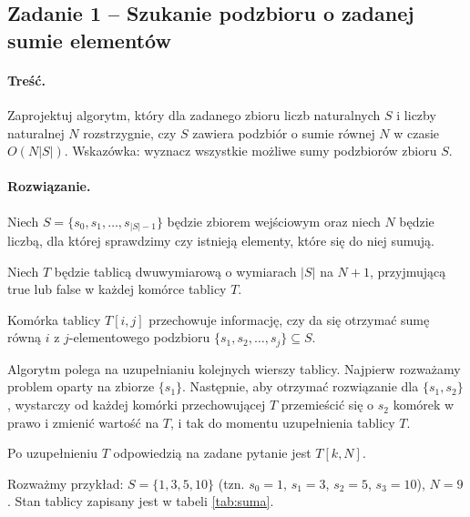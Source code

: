 \subsection{Zadanie 1 -- Szukanie podzbioru o zadanej sumie elementów}

\paragraph{Treść.} Zaprojektuj algorytm, który dla zadanego zbioru 
liczb naturalnych $S$ i liczby naturalnej $N$ rozstrzygnie,
czy $S$ zawiera podzbiór o sumie równej $N$ w czasie $O(N |S|)$.
Wskazówka: wyznacz wszystkie możliwe sumy podzbiorów zbioru $S$.

\paragraph{Rozwiązanie.} Niech $S = \{s_0, s_1, \dots, s_{|S| - 1}\}$ będzie zbiorem wejściowym oraz 
niech $N$ będzie liczbą, dla której sprawdzimy czy istnieją elementy, które się do niej sumują.

Niech $T$ będzie tablicą dwuwymiarową o wymiarach $|S|$ na $N + 1$, przyjmującą
\textsf{true} lub \textsf{false} w każdej komórce tablicy $T$.

Komórka tablicy $T[i, j]$ przechowuje informację, czy da się otrzymać 
sumę równą $i$ z $j$-elementowego podzbioru $\{s_1, s_2, \dots, s_j\} \subseteq S$.

Algorytm polega na uzupełnianiu kolejnych wierszy tablicy.
Najpierw rozważamy problem oparty na zbiorze $\{s_1\}$. 
Następnie, aby otrzymać rozwiązanie dla $\{s_1, s_2\}$, wystarczy
od każdej komórki przechowującej $T$ przemieścić się o $s_2$ komórek w prawo
i zmienić wartość na $T$, i tak do momentu uzupełnienia tablicy $T$.

Po uzupełnieniu $T$ odpowiedzią na zadane pytanie jest $T[k, N]$.

Rozważmy przykład: $S = \{1, 3, 5, 10\}$ (tzn. $s_0=1$, $s_1=3$, $s_2=5$, $s_3=10$), 
$N = 9$. Stan tablicy zapisany jest w tabeli \ref{tab:suma}.

